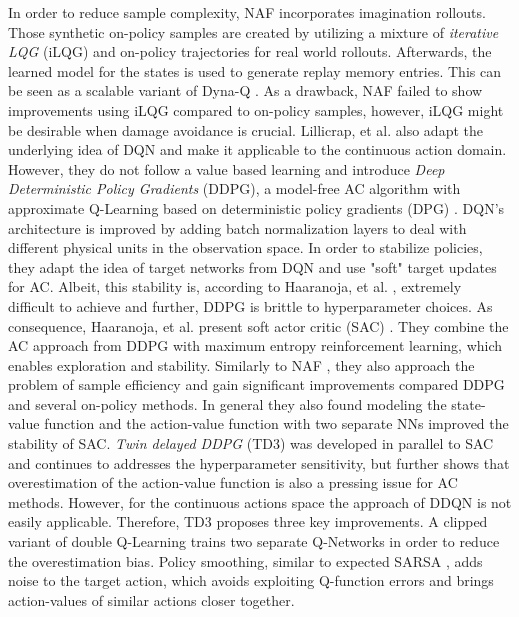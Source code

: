 	In order to reduce sample complexity, NAF incorporates imagination rollouts. 
	Those synthetic on-policy samples are created by utilizing a mixture of \textit{iterative LQG} (iLQG) \cite{Todorov2005} and on-policy trajectories for real world rollouts.
	Afterwards, the learned model for the states is used to generate replay memory entries. 
	This can be seen as a scalable variant of Dyna-Q \cite{Sutton1990}. 
	As a drawback, NAF failed to show improvements using iLQG compared to on-policy samples, however, iLQG might be desirable when damage avoidance is crucial. 
	Lillicrap, et al. \cite{Lillicrap2016} also adapt the underlying idea of DQN \cite{Mnih2015} and make it applicable to the continuous action domain. 
	However, they do not follow a value based learning and introduce \textit{Deep Deterministic Policy Gradients} (DDPG), a model-free AC algorithm with approximate Q-Learning based on deterministic policy gradients (DPG) \cite{Silver2014}.
	DQN's \cite{Mnih2015} architecture is improved by adding batch normalization layers \cite{Ioffe2015} to deal with different physical units in the observation space. 
	In order to stabilize policies, they adapt the idea of target networks from DQN \cite{Mnih2015} and use "soft" target updates for AC. 
	Albeit, this stability is, according to Haaranoja, et al. \cite{Haarnoja2018}, extremely difficult to achieve and further, DDPG is brittle to hyperparameter choices. 
	As consequence, Haaranoja, et al. present soft actor critic (SAC) \cite{Haarnoja2018}.
	They combine the AC approach from DDPG \cite{Lillicrap2016} with maximum entropy reinforcement learning, which enables exploration and stability. 
	Similarly to NAF \cite{Gu2016}, they also approach the problem of sample efficiency and gain significant improvements compared DDPG and several on-policy methods.
	In general they also found modeling the state-value function and the action-value function with two separate NNs improved the stability of SAC. 
	\textit{Twin delayed DDPG} (TD3) \cite{Fujimoto2018} was developed in parallel to SAC and continues to addresses the hyperparameter sensitivity, but further shows that overestimation of the action-value function is also a pressing issue for AC methods. 
	However, for the continuous actions space the approach of DDQN \cite{VanHasselt2016} is not easily applicable.
	Therefore, TD3 proposes three key improvements.
	A clipped variant of double Q-Learning \cite{VanHasselt2010} trains two separate Q-Networks in order to reduce the overestimation bias.
	Policy smoothing, similar to expected SARSA \cite{VanSeijen2009}, adds noise to the target action, which avoids exploiting Q-function errors and brings action-values of similar actions closer together.

